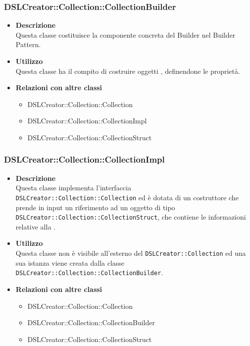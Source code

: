 \subsubsection{DSLCreator::Collection::CollectionBuilder}
                    \begin{itemize}
                        \item \textbf{Descrizione} \hfill \\
                            Questa classe costituisce la componente concreta del Builder nel Builder Pattern.
                        \item \textbf{Utilizzo} \hfill \\
                            Questa classe ha il compito di costruire oggetti , definendone le proprietà.
                        \item \textbf{Relazioni con altre classi}
                            \begin{itemize}
                              \item DSLCreator::Collection::Collection
                              \item DSLCreator::Collection::CollectionImpl
                              \item DSLCreator::Collection::CollectionStruct
                            \end{itemize}
                    \end{itemize}

 \subsubsection{DSLCreator::Collection::CollectionImpl}
                    \begin{itemize}
                        \item \textbf{Descrizione} \hfill \\
                            Questa classe implementa l'interfaccia \texttt{DSLCreator::Collection::Collection} ed è dotata di un costruttore che prende in input un riferimento ad un oggetto di tipo \texttt{DSLCreator::Collection::CollectionStruct}, che contiene le informazioni relative alla .
                        \item \textbf{Utilizzo} \hfill \\
                            Questa classe non è visibile all'esterno del  \texttt{DSLCreator::Collection} ed una sua istanza viene creata dalla classe \texttt{DSLCreator::Collection::CollectionBuilder}.
                        \item \textbf{Relazioni con altre classi}
                            \begin{itemize}
                              \item DSLCreator::Collection::Collection
                              \item DSLCreator::Collection::CollectionBuilder
                              \item DSLCreator::Collection::CollectionStruct
                            \end{itemize}
                    \end{itemize}

